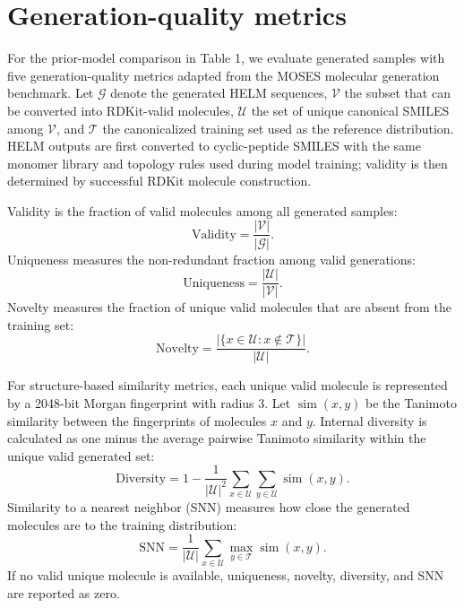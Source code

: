 \documentclass[12pt]{article}
\begin{document}
\section{Generation-quality metrics}
\label{supsec:generation_metrics}

For the prior-model comparison in Table 1, we evaluate generated samples with five generation-quality metrics adapted from the MOSES molecular generation benchmark.
Let $\mathcal{G}$ denote the generated HELM sequences, $\mathcal{V}$ the subset that can be converted into RDKit-valid molecules, $\mathcal{U}$ the set of unique canonical SMILES among $\mathcal{V}$, and $\mathcal{T}$ the canonicalized training set used as the reference distribution.
HELM outputs are first converted to cyclic-peptide SMILES with the same monomer library and topology rules used during model training; validity is then determined by successful RDKit molecule construction.

Validity is the fraction of valid molecules among all generated samples:
\begin{equation}
\mathrm{Validity}=\frac{|\mathcal{V}|}{|\mathcal{G}|}.
\end{equation}
Uniqueness measures the non-redundant fraction among valid generations:
\begin{equation}
\mathrm{Uniqueness}=\frac{|\mathcal{U}|}{|\mathcal{V}|}.
\end{equation}
Novelty measures the fraction of unique valid molecules that are absent from the training set:
\begin{equation}
\mathrm{Novelty}=\frac{|\{x\in\mathcal{U}:x\notin\mathcal{T}\}|}{|\mathcal{U}|}.
\end{equation}

For structure-based similarity metrics, each unique valid molecule is represented by a 2048-bit Morgan fingerprint with radius 3.
Let $\operatorname{sim}(x,y)$ be the Tanimoto similarity between the fingerprints of molecules $x$ and $y$.
Internal diversity is calculated as one minus the average pairwise Tanimoto similarity within the unique valid generated set:
\begin{equation}
\mathrm{Diversity}=1-\frac{1}{|\mathcal{U}|^2}\sum_{x\in\mathcal{U}}\sum_{y\in\mathcal{U}}\operatorname{sim}(x,y).
\end{equation}
Similarity to a nearest neighbor (SNN) measures how close the generated molecules are to the training distribution:
\begin{equation}
\mathrm{SNN}=\frac{1}{|\mathcal{U}|}\sum_{x\in\mathcal{U}}\max_{y\in\mathcal{T}}\operatorname{sim}(x,y).
\end{equation}
If no valid unique molecule is available, uniqueness, novelty, diversity, and SNN are reported as zero.
\end{document}
